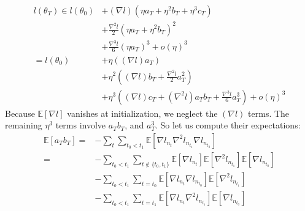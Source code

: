 \documentclass[openany, notitlepage, justified]{tufte-book}
\theoremstyle{plain}
\theoremstyle{definition}
\newcommand{\wrap}[1]{\left(#1\right)}
\newcommand{\expct}[1]{\mathbb{E}\left[#1\right]}
\begin{document}
\begin{shaded}
\begin{align*}
                    l(\theta_T)
                    \in
                            l(\theta_0)
                    &+     (\nabla   l)   (\eta a_T + \eta^2 b_T + \eta^3 c_T)                              \\
                    &+\frac{\nabla^2 l}{2}(\eta a_T + \eta^2 b_T             )^2                            \\
                    &+\frac{\nabla^3 l}{6}(\eta a_T                          )^3 
                     +o(\eta)^3                                                                             \\
                    =
                        l(\theta_0)
                    &+  \eta       \wrap{(\nabla l) a_T                               }                     \\
                    &+  \eta^2     \wrap{(\nabla l) b_T + \frac{\nabla^2 l}{2} a_T^2  }                     \\
                    &+  \eta^3     \wrap{(\nabla l) c_T + (\nabla^2 l) a_T b_T + \frac{\nabla^3 l}{6} a_T^3}
                     +o(\eta)^3                                                                             
                \end{align*}
                Because $\expct{\nabla l}$ vanishes at initialization, we neglect
                the $(\nabla l)$ terms.  The remaining $\eta^3$ terms involve
                $a_T b_T$, and $a_T^3$.  So let us
                compute their expectations:
                \begin{align*}
                    \expct{a_T b_T}
                        =&- \sum_{t} \sum_{t_0 < t_1}
                            \expct{\nabla l_{n_t} \nabla^2 l_{n_{t_1}} \nabla l_{n_{t_0}}}
                        \\
                        =&- \sum_{t_0 < t_1}  
                            \sum_{t \notin \{t_0, t_1\}} 
                                \expct{\nabla l_{n_t}} \expct{\nabla^2 l_{n_{t_1}}} \expct{\nabla l_{n_{t_0}}}
                        \\&- \sum_{t_0 < t_1}  
                            \sum_{t = t_0}
                                \expct{\nabla l_{n_t} \nabla l_{n_{t_0}}} \expct{\nabla^2 l_{n_{t_1}}}
                        \\&- \sum_{t_0 < t_1}  
                            \sum_{t = t_1}
                                \expct{\nabla l_{n_t} \nabla^2 l_{n_{t_1}}} \expct{\nabla l_{n_{t_0}}}
                \end{align*}

\end{shaded}
\end{document}

